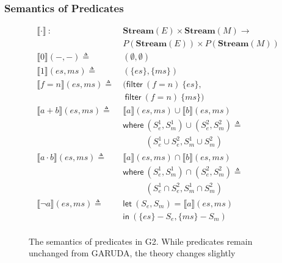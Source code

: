 \documentclass[sigconf,usenames,dvipsnames,svgnames,table]{acmart}
\newcommand{\interp}[1]{\llbracket #1 \rrbracket}
\def \sysname {\textsc{G2}\xspace}
\def \oldname {\textsc{GARUDA}\xspace}
\begin{document}
      \subsubsection{Semantics of Predicates}\label{sec:spec:sem:pred}

        \begin{figure}
          \centering
          { %
          \begin{align*}
            \interp{ \cdot }\ 
              :\ \ &
              \mathbf{Stream}(E)\times \mathbf{Stream}(M) \rightarrow \\
              & P(\mathbf{Stream}(E))\times P(\mathbf{Stream}(M)) 
              \\\hline
            \interp{ 0 }(-, -)
              \triangleq\ &
              (\emptyset , \emptyset)
              \\ %
            \interp{ 1 }(es, ms)
              \triangleq\ &
              (\{es\},\{ms\})
              \\
            \interp{ f=n }(es, ms)
              \triangleq\ &
                (\mathsf{filter}\ (f=n)\ \{es\},\\
              &\ \mathsf{filter}\ (f=n)\ \{ms\}) 
              \\
            \interp{ a + b }(es, ms)
              \triangleq\ &
              \interp { a }(es, ms)\cup
              \interp { b }(es, ms) \\
              &\mathsf{where}\ 
                (S_e^1, S_m^1)\cup (S_e^2, S_m^2)\triangleq\\
                &\quad\quad\ \ \ 
                (S_e^1\cup S_e^2, S_m^1\cup S_m^2)\\
            \interp { a \cdot b }(es, ms)
              \triangleq\ &
              \interp { a }(es, ms)\cap
              \interp { b }(es, ms) \\
              &\mathsf{where}\ 
                (S_e^1, S_m^1)\cap (S_e^2, S_m^2)\triangleq\\
                &\quad\quad\ \ \ 
                (S_e^1\cap S_e^2, S_m^1\cap S_m^2)\\
            \interp { \neg a }(es, ms)
              \triangleq\ &
              \mathsf{let}\ (S_e, S_m) = \interp {a}(es, ms) \\
              &\mathsf{in}\ (\{es\} - S_e, \{ms\} - S_m)
              \\
          \end{align*}}
          \caption{The semantics of predicates in \sysname.  While predicates remain unchanged from \oldname, the theory changes slightly}
          \label{fig:spec:sem:pol}
        \end{figure}
\end{document}
